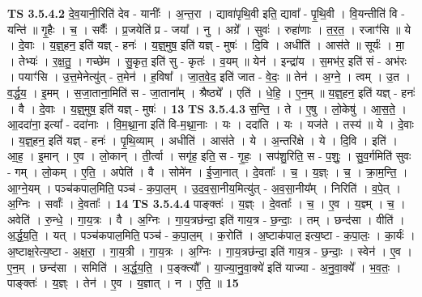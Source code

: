 \documentclass[17pt]{extarticle}
\begin{document}
                  \newline
                                \textbf{ TS 3.5.4.2} \newline
                  दे॒व॒यानी॒रिति॑ देव - यानीः᳚ । अ॒न्त॒रा । द्यावा॑पृथि॒वी इति॒ द्यावा᳚ - पृ॒थि॒वी । वि॒यन्तीति॑ वि - यन्ति॑ ॥ गृ॒हैः । च॒ । सर्वैः᳚ । प्र॒जयेति॑ प्र - जया᳚ । नु । अग्रे᳚ । सुवः॑ । रुहा॑णाः । त॒र॒त॒ । रजाꣳ॑सि ॥ ये । दे॒वाः । य॒ज्ञ्॒हन॒ इति॑ यज्ञ् - हनः॑ । य॒ज्ञ्॒मुष॒ इति॑ यज्ञ् - मुषः॑ । दि॒वि । अधीति॑ । आस॑ते ॥ सूर्यः॑ । मा॒ । तेभ्यः॑ । र॒क्ष॒तु॒ । गच्छे॑म । सु॒कृत॒ इति॑ सु - कृतः॑ । व॒यम् ॥ येन॑ । इन्द्रा॑य । स॒मभ॑र॒ इति॑ सं - अभ॑रः । पयाꣳ॑सि । उ॒त्त॒मेनेत्यु॑त् - त॒मेन॑ । ह॒विषा᳚ । जा॒त॒वे॒द॒ इति॑ जात - वे॒दः॒ ॥ तेन॑ । अ॒ग्ने॒ । त्वम् । उ॒त । व॒र्द्ध॒य॒ । इ॒मम् । स॒जा॒ताना॒मिति॑ स - जा॒ताना᳚म् । श्रैष्ठ्ये᳚ । एति॑ । धे॒हि॒ । ए॒न॒म् ॥ य॒ज्ञ्॒हन॒ इति॑ यज्ञ् - हनः॑ । वै । दे॒वाः । य॒ज्ञ्॒मुष॒ इति॑ यज्ञ् - मुषः॑ । \textbf{  13} \newline
                  \newline
                                \textbf{ TS 3.5.4.3} \newline
                  स॒न्ति॒ । ते । ए॒षु । लो॒केषु॑ । आ॒स॒ते॒ । आ॒ददा॑ना॒ इत्या᳚ - ददा॑नाः । वि॒म॒थ्ना॒ना इति॑ वि-म॒थ्ना॒नाः । यः । ददा॑ति । यः । यज॑ते । तस्य॑ ॥ ये । दे॒वाः । य॒ज्ञ्॒हन॒ इति॑ यज्ञ् - हनः॑ । पृ॒थि॒व्याम् । अधीति॑ । आस॑ते । ये । अ॒न्तरि॑क्षे । ये । दि॒वि । इति॑ । आ॒ह॒ । इ॒मान् । ए॒व । लो॒कान् । ती॒र्त्वा । सगृ॑ह॒ इति॒ स - गृ॒हः॒ । सप॑शु॒रिति॒ स - प॒शुः॒ । सु॒व॒र्गमिति॑ सुवः - गम् । लो॒कम् । ए॒ति॒ । अपेति॑ । वै । सोमे॑न । ई॒जा॒नात् । दे॒वताः᳚ । च॒ । य॒ज्ञ्ः । च॒ । क्रा॒म॒न्ति॒ । आ॒ग्ने॒यम् । पञ्च॑कपाल॒मिति॒ पञ्च॑ - क॒पा॒ल॒म् । उ॒द॒व॒सा॒नीय॒मित्यु॑त् - अ॒व॒सा॒नीय᳚म् । निरिति॑ । व॒पे॒त् । अ॒ग्निः । सर्वाः᳚ । दे॒वताः᳚ । \textbf{  14} \newline
                  \newline
                                \textbf{ TS 3.5.4.4} \newline
                  पाङ्क्तः॑ । य॒ज्ञ्ः । दे॒वताः᳚ । च॒ । ए॒व । य॒ज्ञ्म् । च॒ । अवेति॑ । रु॒न्धे॒ । गा॒य॒त्रः । वै । अ॒ग्निः । गा॒य॒त्रछ॑न्दा॒ इति॑ गाय॒त्र - छ॒न्दाः॒ । तम् । छन्द॑सा । वीति॑ । अ॒र्द्ध॒य॒ति॒ । यत् । पञ्च॑कपाल॒मिति॒ पञ्च॑ - क॒पा॒ल॒म् । क॒रोति॑ । अ॒ष्टाक॑पाल॒ इत्य॒ष्टा - क॒पा॒लः॒ । का॒र्यः॑ । अ॒ष्टाक्ष॒रेत्य॒ष्टा - अ॒क्ष॒रा॒ । गा॒य॒त्री । गा॒य॒त्रः । अ॒ग्निः । गा॒य॒त्रछ॑न्दा॒ इति॑ गाय॒त्र - छ॒न्दाः॒ । स्वेन॑ । ए॒व । ए॒न॒म् । छन्द॑सा । समिति॑ । अ॒र्द्ध॒य॒ति॒ । प॒ङ्क्त्यौ᳚ । या॒ज्या॒नु॒वा॒क्ये॑ इति॑ याज्या - अ॒नु॒वा॒क्ये᳚ । भ॒व॒तः॒ । पाङ्क्तः॑ । य॒ज्ञ्ः । तेन॑ । ए॒व । य॒ज्ञात् । न । ए॒ति॒ ॥ \textbf{  15 } \newline
\end{document}
